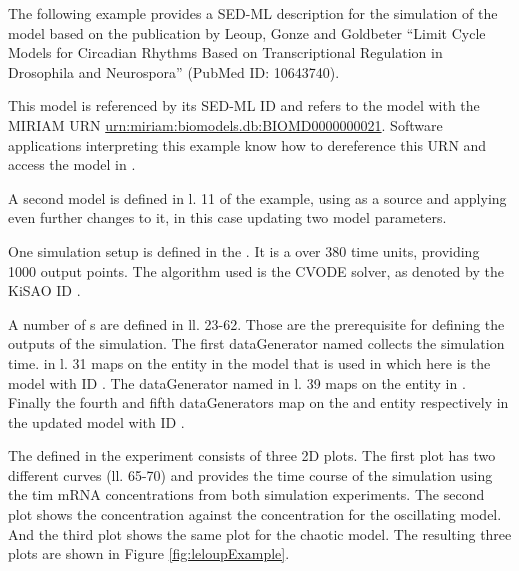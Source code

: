 The following example provides a SED-ML description for the simulation of the model based on the publication by Leoup, Gonze and Goldbeter ``Limit Cycle Models for Circadian Rhythms Based on Transcriptional Regulation in Drosophila and Neurospora'' (PubMed ID: 10643740).

This model is referenced by its SED-ML ID   and refers to the model with the MIRIAM URN \url{urn:miriam:biomodels.db:BIOMD0000000021}. 
Software applications interpreting this example know how to dereference this URN and access the model in \biom \citep{N+06}.

A second model is defined in l. 11 of the example, using  as a source and applying even further changes to it, in this case updating two model parameters.

One simulation setup is defined in the . It is a  over 380 time units, providing 1000 output points. The algorithm used is the CVODE solver, as denoted by the KiSAO ID .

A number of s are defined in ll. 23-62. Those are the prerequisite for defining the outputs of the simulation. The first dataGenerator named  collects the simulation time.  in l. 31 maps on the  entity in the model that is used in  which here is the model with ID . The dataGenerator named  in l. 39 maps on the  entity in . Finally  the fourth and fifth dataGenerators map on the  and  entity respectively in the updated model with ID .

The  defined in the experiment consists of three 2D plots. The first plot has two different curves (ll. 65-70) and provides the time course of the simulation using the tim mRNA concentrations from both simulation experiments. The second plot shows the  concentration against the  concentration for the oscillating model. And the third plot shows the same plot for the chaotic model. The resulting three plots are shown in Figure \ref{fig:leloupExample}. 
%
%




